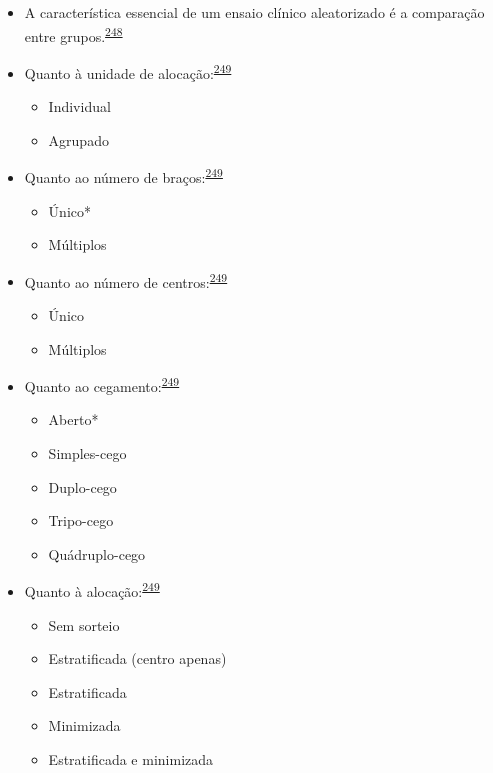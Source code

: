 \documentclass[
  a4paper,
]{book}
\begin{document}
\begin{itemize}
\item
  A característica essencial de um ensaio clínico aleatorizado é a comparação entre grupos.\textsuperscript{\protect\hyperlink{ref-bland2011}{248}}
\item
  Quanto à unidade de alocação:\textsuperscript{\protect\hyperlink{ref-Bruce2022}{249}}

  \begin{itemize}
  \item
    Individual
  \item
    Agrupado
  \end{itemize}
\item
  Quanto ao número de braços:\textsuperscript{\protect\hyperlink{ref-Bruce2022}{249}}

  \begin{itemize}
  \item
    Único*
  \item
    Múltiplos
  \end{itemize}
\item
  Quanto ao número de centros:\textsuperscript{\protect\hyperlink{ref-Bruce2022}{249}}

  \begin{itemize}
  \item
    Único
  \item
    Múltiplos
  \end{itemize}
\item
  Quanto ao cegamento:\textsuperscript{\protect\hyperlink{ref-Bruce2022}{249}}

  \begin{itemize}
  \item
    Aberto*
  \item
    Simples-cego
  \item
    Duplo-cego
  \item
    Tripo-cego
  \item
    Quádruplo-cego
  \end{itemize}
\item
  Quanto à alocação:\textsuperscript{\protect\hyperlink{ref-Bruce2022}{249}}

  \begin{itemize}
  \item
    Sem sorteio
  \item
    Estratificada (centro apenas)
  \item
    Estratificada
  \item
    Minimizada
  \item
    Estratificada e minimizada
  \end{itemize}
\end{itemize}
\end{document}
